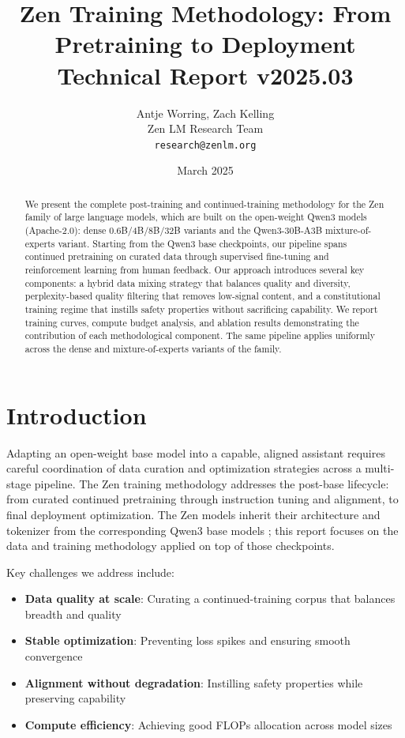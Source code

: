\documentclass[11pt,a4paper]{article}
\title{\textbf{Zen Training Methodology: From Pretraining to Deployment}\\
\large Technical Report v2025.03}
\author{Antje Worring, Zach Kelling \\ Zen LM Research Team\\
\texttt{research@zenlm.org}}
\date{March 2025}
\begin{document}
\maketitle

\begin{abstract}
We present the complete post-training and continued-training methodology for the Zen
family of large language models, which are built on the open-weight Qwen3 models
\cite{qwen3} (Apache-2.0): dense 0.6B/4B/8B/32B variants and the Qwen3-30B-A3B
mixture-of-experts variant. Starting from the Qwen3 base checkpoints, our pipeline spans
continued pretraining on curated data through supervised fine-tuning and reinforcement
learning from human feedback. Our approach introduces several key components: a hybrid
data mixing strategy that balances quality and diversity, perplexity-based quality filtering
that removes low-signal content, and a constitutional training regime that instills
safety properties without sacrificing capability. We report training curves, compute
budget analysis, and ablation results demonstrating the contribution of each
methodological component. The same pipeline applies uniformly across the dense and
mixture-of-experts variants of the family.
\end{abstract}

\section{Introduction}

Adapting an open-weight base model into a capable, aligned assistant requires careful
coordination of data curation and optimization strategies across a multi-stage pipeline.
The Zen training methodology addresses the post-base lifecycle: from curated continued
pretraining through instruction tuning and alignment, to final deployment optimization.
The Zen models inherit their architecture and tokenizer from the corresponding Qwen3 base
models \cite{qwen3}; this report focuses on the data and training methodology applied on
top of those checkpoints.

Key challenges we address include:
\begin{itemize}
  \item \textbf{Data quality at scale}: Curating a continued-training corpus that balances breadth and quality
  \item \textbf{Stable optimization}: Preventing loss spikes and ensuring smooth convergence
  \item \textbf{Alignment without degradation}: Instilling safety properties while preserving capability
  \item \textbf{Compute efficiency}: Achieving good FLOPs allocation across model sizes
\end{itemize}
\end{document}
